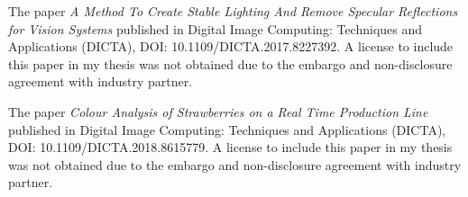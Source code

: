 \documentclass[fleqn,twoside,12pt]{report}
\renewcommand{\baselinestretch}{2}
\begin{document}
The paper \textit{A Method To Create Stable Lighting And Remove Specular Reflections for Vision Systems} published in Digital Image Computing: Techniques and Applications (DICTA), DOI: 10.1109/DICTA.2017.8227392. A license to include this paper in my thesis was not obtained due to the embargo and non-disclosure agreement with industry partner.

The paper \textit{Colour Analysis of Strawberries on a Real Time Production Line} published in Digital Image Computing: Techniques and Applications (DICTA), DOI: 10.1109/DICTA.2018.8615779. A license to include this paper in my thesis was not obtained due to the embargo and non-disclosure agreement with industry partner.

\vspace*{\fill}%



\renewcommand{\baselinestretch}{1.0} 
\newpage
\tableofcontents

\newpage
\listoffigures

\newpage
\listoftables

%
%
%
%
%

%

%
%
\end{document}
